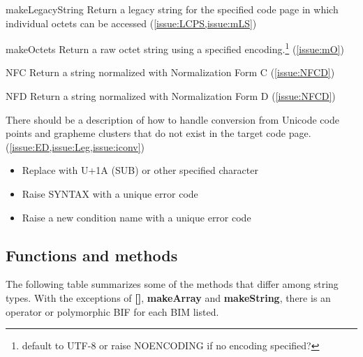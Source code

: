 \documentclass[b4paper]{article}
\begin{document}
\begin{itemize}
\begin{definition}
\item [makeLegacyString]
Return a legacy string for the specified code page in which individual octets can be accessed (\cref{issue:LCPS,issue:mLS})
\item [makeOctets]
Return a raw octet string using a specified encoding.\footnote{default
to UTF-8 or raise NOENCODING if no encoding specified?} (\cref{issue:mO})
\item [NFC] Return a string normalized with Normalization Form C (\cref{issue:NFCD})
\item [NFD] Return a string normalized with Normalization Form D (\cref{issue:NFCD})
\end{definition}
\end{itemize}

There should be a description of how to handle conversion from Unicode code
points and grapheme clusters that do not exist in the target code page.
(\cref{issue:ED,issue:Leg,issue:iconv})
\begin{itemize}
\item Replace with U+1A (SUB) or other specified character
\item Raise SYNTAX with a unique error code
\item Raise a new condition name with a unique error code
\end{itemize}

\subsection{Functions and methods}
The following table summarizes some of the methods that differ among string types.
With the exceptions of \textbf{{[}{]}}, \textbf{makeArray} and \textbf{makeString},
there is an operator or polymorphic BIF for each BIM listed.
\end{document}
